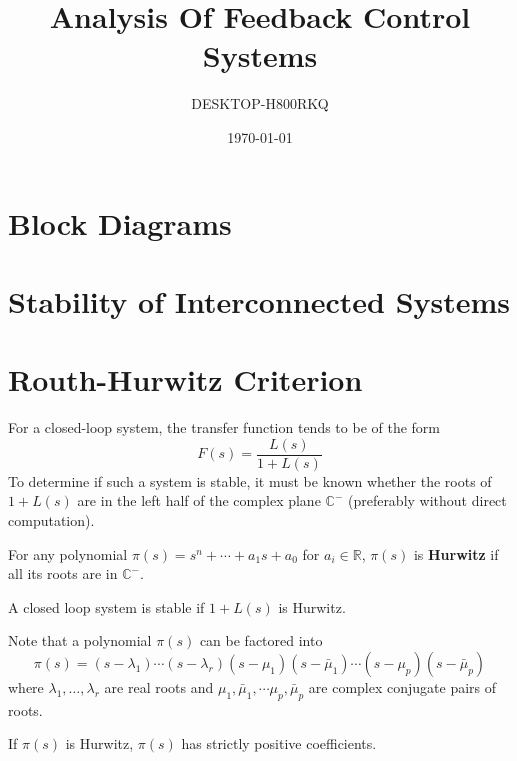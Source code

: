 \documentclass[11pt]{article}
\author{DESKTOP-H800RKQ}
\date{\today}
\title{Analysis Of Feedback Control Systems}
\begin{document}
\maketitle
\tableofcontents

\section{Block Diagrams}
\label{sec:org279d2db}

\section{Stability of Interconnected Systems}
\label{sec:orgc36cdd0}

\section{Routh-Hurwitz Criterion}
\label{sec:orgf7c1ec0}
For a closed-loop system, the transfer function tends to be of the form
$$ F(s) = \frac{L(s)}{1 + L(s)} $$
To determine if such a system is stable, it must be known whether
the roots of \(1+L(s)\) are in the left half of the complex plane
\(\mathbb{C}^{-}\) (preferably without direct computation).

For any polynomial \(\pi(s) = s^{n} + \cdots + a_{1}s + a_{0}\) for
\(a_{i} \in \mathbb{R}\),
\(\pi(s)\) is \textbf{Hurwitz} if all its roots are in \(\mathbb{C}^{-}\).

A closed loop system is stable if \(1 + L(s)\) is Hurwitz.

Note that a polynomial \(\pi(s)\) can be factored into
$$ \pi(s) = (s - \lambda_{1})\cdots (s - \lambda_{r}) (s - \mu_{1})(s - \bar{\mu}_{1}) \cdots (s - \mu_{p})(s - \bar{\mu}_{p}) $$
where \(\lambda_{1}, \dots, \lambda_{r}\) are real roots and \(\mu_{1}, \bar{\mu}_{1}, \cdots \mu_{p}, \bar{\mu}_{p}\) are complex conjugate pairs of roots.

If \(\pi(s)\) is Hurwitz, \(\pi(s)\) has strictly positive coefficients.
\end{document}
